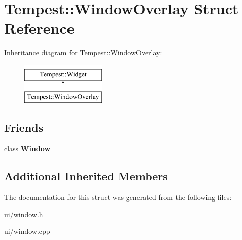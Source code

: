 \hypertarget{struct_tempest_1_1_window_overlay}{\section{Tempest\+:\+:Window\+Overlay Struct Reference}
\label{struct_tempest_1_1_window_overlay}
}
Inheritance diagram for Tempest\+:\+:Window\+Overlay\+:\begin{figure}[H]
\begin{center}
\leavevmode
\includegraphics[height=2.000000cm]{struct_tempest_1_1_window_overlay}
\end{center}
\end{figure}
\subsection*{Friends}
\begin{DoxyCompactItemize}
\item 
\hypertarget{struct_tempest_1_1_window_overlay_a553f958a25683445088050a69d3de8e9}{class {\bfseries Window}}\label{struct_tempest_1_1_window_overlay_a553f958a25683445088050a69d3de8e9}

\end{DoxyCompactItemize}
\subsection*{Additional Inherited Members}


The documentation for this struct was generated from the following files\+:\begin{DoxyCompactItemize}
\item 
ui/window.\+h\item 
ui/window.\+cpp\end{DoxyCompactItemize}

